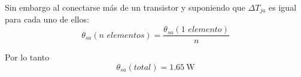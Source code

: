 	Sin embargo al conectarse más de un transistor y suponiendo que $\Delta T_{ja}$ es igual para cada uno de ellos:
	\begin{equation*}
		\theta_{sa} (\textit{n elementos}) = \frac{\theta_{sa} (\textit{1 elemento})}{n}
	\end{equation*}

	Por lo tanto
	\begin{equation*}
		\boxed{\theta_{sa} (\textit{total}) = \SI{1.65}{\W}}
	\end{equation*}


